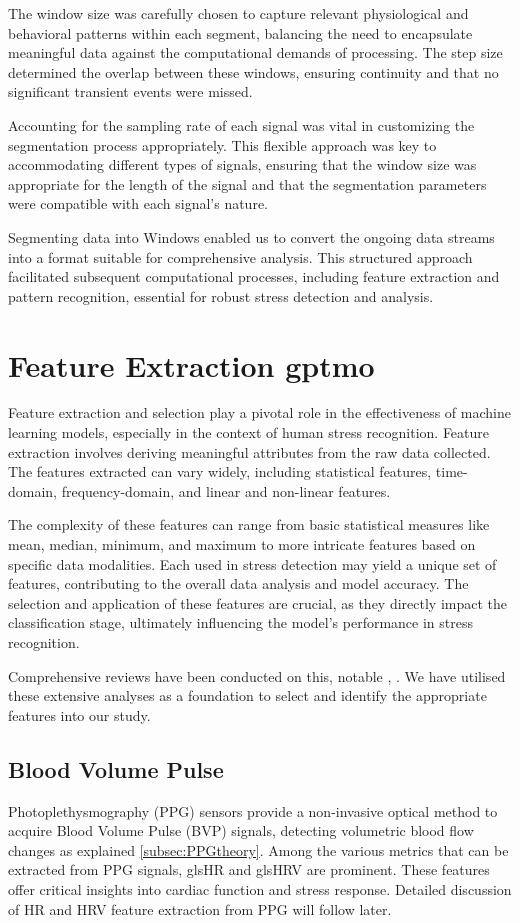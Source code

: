 The window size was carefully chosen to capture relevant physiological and behavioral patterns within each segment, balancing the need to encapsulate meaningful data against the computational demands of processing. The step size determined the overlap between these windows, ensuring continuity and that no significant transient events were missed.

Accounting for the sampling rate of each signal was vital in customizing the segmentation process appropriately. This flexible approach was key to accommodating different types of signals, ensuring that the window size was appropriate for the length of the signal and that the segmentation parameters were compatible with each signal's nature.

Segmenting data into Windows enabled us to convert the ongoing data streams into a format suitable for comprehensive analysis. This structured approach facilitated subsequent computational processes, including feature extraction and pattern recognition, essential for robust stress detection and analysis.

\section{Feature Extraction \gls*{gptmo}}
Feature extraction and selection play a pivotal role in the effectiveness of machine learning models, especially in the context of human stress recognition. Feature extraction involves deriving meaningful attributes from the raw data collected. The features extracted can vary widely, including statistical features, time-domain, frequency-domain, and linear and non-linear features.

The complexity of these features can range from basic statistical measures like mean, median, minimum, and maximum to more intricate features based on specific data modalities. Each used in stress detection may yield a unique set of features, contributing to the overall data analysis and model accuracy. The selection and application of these features are crucial, as they directly impact the classification stage, ultimately influencing the model's performance in stress recognition.

Comprehensive reviews have been conducted on this, notable \textcite{review1}, \textcite{arsalan}. We have utilised these extensive analyses as a foundation to select and identify the appropriate features into our study.


\subsection{Blood Volume Pulse}
Photoplethysmography (PPG) sensors provide a non-invasive optical method to acquire Blood Volume Pulse (BVP) signals, detecting volumetric blood flow changes as explained \autoref*{subsec:PPGtheory}. Among the various metrics that can be extracted from PPG signals, gls{HR} and  gls{HRV} are prominent. These features offer critical insights into cardiac function and stress response. Detailed discussion of HR and HRV feature extraction from PPG will follow later.

